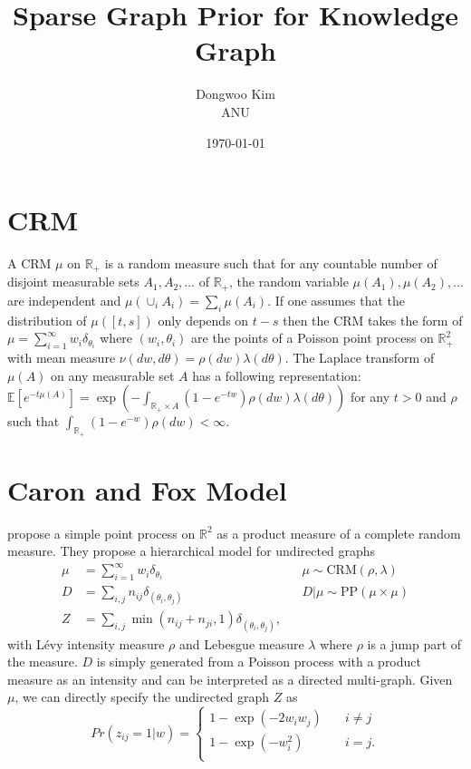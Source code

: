 \documentclass{article}
\title{Sparse Graph Prior for Knowledge Graph}
\date{\today}
\author{Dongwoo Kim\\ANU}
\begin{document}
\maketitle

\section{CRM}
A CRM $\mu$ on $\mathbb{R}_+$ is a random measure such that for any countable number of disjoint measurable sets $A_1, A_2, ...$ of $\mathbb{R}_+$, the random variable $\mu(A_1), \mu(A_2), ...$ are independent and $\mu(\cup_i A_i) = \sum_i \mu(A_i)$. If one assumes that the distribution of $\mu([t,s])$ only depends on $t-s$ then the CRM takes the form of $\mu = \sum_{i=1}^{\infty}w_i\delta_{\theta_i}$ where $(w_i, \theta_i)$ are the points of a Poisson point process on $\mathbb{R}_+^2$ with mean measure $\nu(dw, d\theta) = \rho(dw)\lambda(d\theta)$. The Laplace transform of $\mu(A)$ on any measurable set $A$ has a following representation: $\mathbb{E}[e^{-t\mu(A)}] = \exp(-\int_{\mathbb{R}_+ \times A}(1-e^{-tw})\rho(dw)\lambda(d\theta))$ for any $t>0$ and $\rho$ such that $\int_{\mathbb{R}_+}(1-e^{-w})\rho(dw) < \infty$.

\section{Caron and Fox Model}

\cite{Caron2015} propose a simple point process on $\mathbb{R}^2$ as a product measure of a complete random measure. They propose a hierarchical model for undirected graphs
\begin{align}
\mu &= \sum_{i=1}^{\infty} w_i \delta_{\theta_i} & &\mu \sim \text{CRM}(\rho, \lambda)\\
D &= \sum_{i,j} n_{ij} \delta_{(\theta_i, \theta_j)} & &D|\mu \sim \text{PP}(\mu \times \mu)\\
Z &=\sum_{i,j} \min(n_{ij} + n_{ji}, 1)\delta_{(\theta_i, \theta_j)}, \label{eqn:cnf}&&
\end{align}
with L\'{e}vy intensity measure $\rho$ and Lebesgue measure $\lambda$ where $\rho$ is a jump part of the measure. $D$ is simply generated from a Poisson process with a product measure as an intensity and can be interpreted as a directed multi-graph.
Given $\mu$, we can directly specify the undirected graph $Z$ as
\[ Pr(z_{ij}=1|w) = 
  \begin{cases}
    1 - \exp(-2w_iw_j)       & \quad i \neq j\\
    1 - \exp(-w_i^2) & \quad i = j.\\
  \end{cases}
\]
\end{document}
